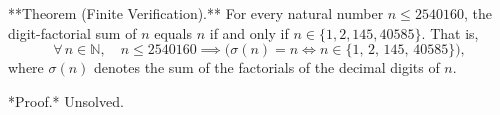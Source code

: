 
**Theorem (Finite Verification).** For every natural number $n \leq 2540160$, the digit-factorial sum of $n$ equals $n$ if and only if $n \in \{1, 2, 145, 40585\}$. That is,
$$\forall\, n \in \mathbb{N},\quad n \leq 2540160 \implies \bigl(\sigma(n) = n \iff n \in \{1,\, 2,\, 145,\, 40585\}\bigr),$$
where $\sigma(n)$ denotes the sum of the factorials of the decimal digits of $n$.

*Proof.* Unsolved.